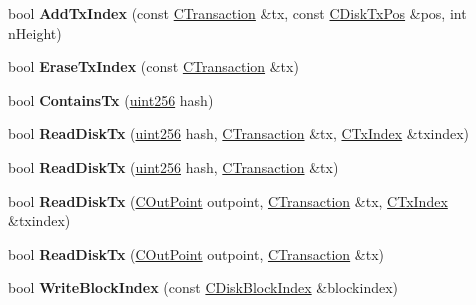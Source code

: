 \begin{DoxyCompactItemize}
\item 
\mbox{\label{class_c_tx_d_b_a6c0d7c688e8fd7ac28afde78ae6b624e}} 
bool {\bfseries Add\+Tx\+Index} (const \mbox{\hyperlink{class_c_transaction}{C\+Transaction}} \&tx, const \mbox{\hyperlink{class_c_disk_tx_pos}{C\+Disk\+Tx\+Pos}} \&pos, int n\+Height)
\item 
\mbox{\label{class_c_tx_d_b_a5e0f0ed39529758a90953a2a08fc9412}} 
bool {\bfseries Erase\+Tx\+Index} (const \mbox{\hyperlink{class_c_transaction}{C\+Transaction}} \&tx)
\item 
\mbox{\label{class_c_tx_d_b_a09b87317101ed16b6ad99794279f4c2d}} 
bool {\bfseries Contains\+Tx} (\mbox{\hyperlink{classuint256}{uint256}} hash)
\item 
\mbox{\label{class_c_tx_d_b_a32d0e546eee99724776352dd4bf0ae79}} 
bool {\bfseries Read\+Disk\+Tx} (\mbox{\hyperlink{classuint256}{uint256}} hash, \mbox{\hyperlink{class_c_transaction}{C\+Transaction}} \&tx, \mbox{\hyperlink{class_c_tx_index}{C\+Tx\+Index}} \&txindex)
\item 
\mbox{\label{class_c_tx_d_b_ab32f32729feabef7162d5fa225dd0e22}} 
bool {\bfseries Read\+Disk\+Tx} (\mbox{\hyperlink{classuint256}{uint256}} hash, \mbox{\hyperlink{class_c_transaction}{C\+Transaction}} \&tx)
\item 
\mbox{\label{class_c_tx_d_b_a80ee65f82bb1a769b507dc5c701bfacc}} 
bool {\bfseries Read\+Disk\+Tx} (\mbox{\hyperlink{class_c_out_point}{C\+Out\+Point}} outpoint, \mbox{\hyperlink{class_c_transaction}{C\+Transaction}} \&tx, \mbox{\hyperlink{class_c_tx_index}{C\+Tx\+Index}} \&txindex)
\item 
\mbox{\label{class_c_tx_d_b_a4d7f67f600359473ddd2044030323215}} 
bool {\bfseries Read\+Disk\+Tx} (\mbox{\hyperlink{class_c_out_point}{C\+Out\+Point}} outpoint, \mbox{\hyperlink{class_c_transaction}{C\+Transaction}} \&tx)
\item 
\mbox{\label{class_c_tx_d_b_a56f170187a609bd747c29b3a4adddd8e}} 
bool {\bfseries Write\+Block\+Index} (const \mbox{\hyperlink{class_c_disk_block_index}{C\+Disk\+Block\+Index}} \&blockindex)
\item 

\end{DoxyCompactItemize}
